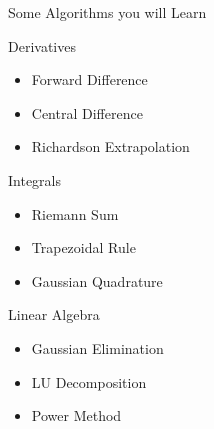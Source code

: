 \documentclass[10pt]{beamer}
\begin{document}
\begin{frame}{Some Algorithms you will Learn}

\begin{block}{Derivatives} 
\begin{itemize}
  \item Forward Difference
  \item Central Difference
  \item Richardson Extrapolation
\end{itemize}
\end{block}

\begin{block}{Integrals} 
\begin{itemize}
  \item Riemann Sum 
  \item Trapezoidal Rule
  \item Gaussian Quadrature
\end{itemize}
\end{block}

\begin{block}{Linear Algebra} 
\begin{itemize}
\item Gaussian Elimination
  \item LU Decomposition
  \item Power Method
\end{itemize}
\end{block}
\end{frame}
\end{document}
